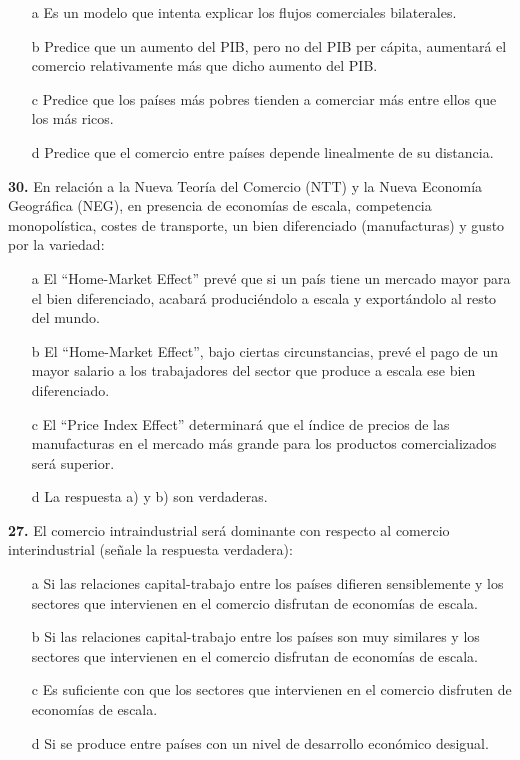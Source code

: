 \documentclass{nuevotema}
\begin{document}
\begin{itemize}
	\item[a] Es un modelo que intenta explicar los flujos comerciales bilaterales.
	\item[b] Predice que un aumento del PIB, pero no del PIB per cápita, aumentará el comercio relativamente más que dicho aumento del PIB.
	\item[c] Predice que los países más pobres tienden a comerciar más entre ellos que los más ricos.
	\item[d] Predice que el comercio entre países depende linealmente de su distancia.
\end{itemize}


\textbf{30.} En relación a la Nueva Teoría del Comercio (NTT) y la Nueva Economía Geográfica (NEG), en presencia de economías de escala, competencia monopolística, costes de transporte, un bien diferenciado (manufacturas) y gusto por la variedad:

\begin{itemize}
	\item[a] El ``Home-Market Effect'' prevé que si un país tiene un mercado mayor para el bien diferenciado, acabará produciéndolo a escala y exportándolo al resto del mundo.
	\item[b] El ``Home-Market Effect'', bajo ciertas circunstancias, prevé el pago de un mayor salario a los trabajadores del sector que produce a escala ese bien diferenciado.
	\item[c] El ``Price Index Effect'' determinará que el índice de precios de las manufacturas en el mercado más grande para los productos comercializados será superior.
	\item[d] La respuesta a) y b) son verdaderas.
\end{itemize}


\textbf{27.} El comercio intraindustrial será dominante con respecto al comercio interindustrial (señale la respuesta verdadera):
\begin{itemize}
	\item[a] Si las relaciones capital-trabajo entre los países difieren sensiblemente y los sectores que intervienen en el comercio disfrutan de economías de escala.
	\item[b] Si las relaciones capital-trabajo entre los países son muy similares y los sectores que intervienen en el comercio disfrutan de economías de escala.
	\item[c] Es suficiente con que los sectores que intervienen en el comercio disfruten de economías de escala.
	\item[d] Si se produce entre países con un nivel de desarrollo económico desigual.
\end{itemize}
\end{document}
